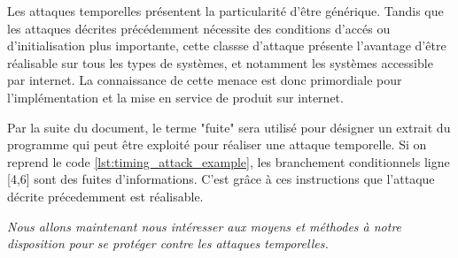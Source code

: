Les attaques temporelles présentent la particularité d'être générique. Tandis que les attaques décrites précédemment nécessite des conditions d'accés ou d'initialisation plus importante, cette classse d'attaque présente l'avantage d'être réalisable sur tous les types de systèmes, et notamment les systèmes accessible par internet. La connaissance de cette menace est donc primordiale pour l'implémentation et la mise en service de produit sur internet.\medbreak

Par la suite du document, le terme "fuite" sera utilisé pour désigner un extrait du programme qui peut être exploité pour réaliser une attaque temporelle. Si on reprend le code \ref{lst:timing_attack_example}, les branchement conditionnels ligne [4,6] sont des fuites d'informations. C'est grâce à ces instructions que l'attaque décrite précedemment est réalisable.\medbreak

\raggedbottom
\textit{Nous allons maintenant nous intéresser aux moyens et méthodes à notre disposition pour se protéger contre les attaques temporelles.}